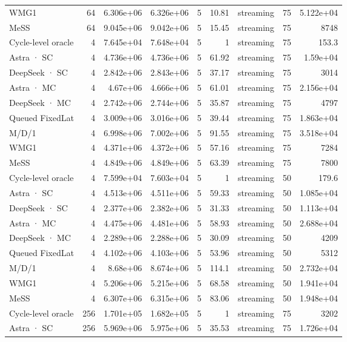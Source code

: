 \begin{tabular}{lrrrrrlrr}
WMG1 & 64 & 6.306e+06 & 6.326e+06 & 5 & 10.81 & streaming & 75 & 5.122e+04 \\
MeSS & 64 & 9.045e+06 & 9.042e+06 & 5 & 15.45 & streaming & 75 & 8748 \\
Cycle-level oracle & 4 & 7.645e+04 & 7.648e+04 & 5 & 1 & streaming & 75 & 153.3 \\
Astra · SC & 4 & 4.736e+06 & 4.736e+06 & 5 & 61.92 & streaming & 75 & 1.59e+04 \\
DeepSeek · SC & 4 & 2.842e+06 & 2.843e+06 & 5 & 37.17 & streaming & 75 & 3014 \\
Astra · MC & 4 & 4.67e+06 & 4.666e+06 & 5 & 61.01 & streaming & 75 & 2.156e+04 \\
DeepSeek · MC & 4 & 2.742e+06 & 2.744e+06 & 5 & 35.87 & streaming & 75 & 4797 \\
Queued FixedLat & 4 & 3.009e+06 & 3.016e+06 & 5 & 39.44 & streaming & 75 & 1.863e+04 \\
M/D/1 & 4 & 6.998e+06 & 7.002e+06 & 5 & 91.55 & streaming & 75 & 3.518e+04 \\
WMG1 & 4 & 4.371e+06 & 4.372e+06 & 5 & 57.16 & streaming & 75 & 7284 \\
MeSS & 4 & 4.849e+06 & 4.849e+06 & 5 & 63.39 & streaming & 75 & 7800 \\
Cycle-level oracle & 4 & 7.599e+04 & 7.603e+04 & 5 & 1 & streaming & 50 & 179.6 \\
Astra · SC & 4 & 4.513e+06 & 4.511e+06 & 5 & 59.33 & streaming & 50 & 1.085e+04 \\
DeepSeek · SC & 4 & 2.377e+06 & 2.382e+06 & 5 & 31.33 & streaming & 50 & 1.113e+04 \\
Astra · MC & 4 & 4.475e+06 & 4.481e+06 & 5 & 58.93 & streaming & 50 & 2.688e+04 \\
DeepSeek · MC & 4 & 2.289e+06 & 2.288e+06 & 5 & 30.09 & streaming & 50 & 4209 \\
Queued FixedLat & 4 & 4.102e+06 & 4.103e+06 & 5 & 53.96 & streaming & 50 & 5312 \\
M/D/1 & 4 & 8.68e+06 & 8.674e+06 & 5 & 114.1 & streaming & 50 & 2.732e+04 \\
WMG1 & 4 & 5.206e+06 & 5.215e+06 & 5 & 68.58 & streaming & 50 & 1.941e+04 \\
MeSS & 4 & 6.307e+06 & 6.315e+06 & 5 & 83.06 & streaming & 50 & 1.948e+04 \\
Cycle-level oracle & 256 & 1.701e+05 & 1.682e+05 & 5 & 1 & streaming & 75 & 3202 \\
Astra · SC & 256 & 5.969e+06 & 5.975e+06 & 5 & 35.53 & streaming & 75 & 1.726e+04 \\

\end{tabular}
